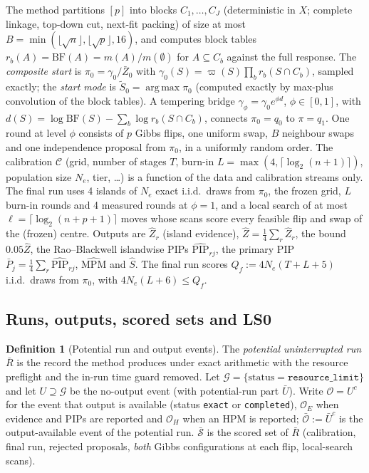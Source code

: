 \documentclass[11pt]{article}
\theoremstyle{definition}
\newtheorem{definition}{Definition}
\theoremstyle{remark}
\newcommand{\Sh}{\widehat S}
\newcommand{\Zh}{\widehat Z}
\newcommand{\PIPh}{\widehat{\mathrm{PIP}}}
\newcommand{\MPM}{\mathrm{MPM}}
\newcommand{\cC}{\mathcal C}
\newcommand{\cS}{\mathcal S}
\newcommand{\cO}{\mathcal O}
\newcommand{\cG}{\mathcal G}
\DeclareMathOperator*{\argmax}{arg\,max}
\begin{document}
The method partitions $[p]$ into blocks $C_1,\dots,C_J$ (deterministic in $X$; complete linkage, top-down cut,
next-fit packing) of size at most $B=\min(\lfloor\sqrt n\rfloor,\lfloor\sqrt p\rfloor,16)$, and computes block tables
$r_b(A)=\mathrm{BF}(A)=m(A)/m(\emptyset)$ for $A\subseteq C_b$ against the full response. The \emph{composite start}
is $\pi_0=\gamma_0/\bar Z_0$ with $\gamma_0(S)=\varpi(S)\prod_br_b(S\cap C_b)$, sampled exactly; the \emph{start
mode} is $\tilde S_0=\argmax\pi_0$ (computed exactly by max-plus convolution of the block tables). A
tempering bridge $\gamma_\phi=\gamma_0e^{\phi d}$, $\phi\in[0,1]$, with $d(S)=\log\mathrm{BF}(S)-\sum_b\log r_b(S\cap C_b)$,
connects $\pi_0=q_0$ to $\pi=q_1$. One round at level $\phi$ consists of $p$ Gibbs flips, one uniform swap, $B$
neighbour swaps and one independence proposal from $\pi_0$, in a uniformly random order. The calibration
$\cC$ (grid, number of stages $T$, burn-in $L=\max(4,\lceil\log_2(n+1)\rceil)$, population size $N_e$, tier, \dots)
is a function of the data and calibration streams only. The final run uses 4 islands of $N_e$ exact i.i.d.\ draws
from $\pi_0$, the frozen grid, $L$ burn-in rounds and 4 measured rounds at $\phi=1$, and a local search of at most
$\ell=\lceil\log_2(n+p+1)\rceil$ moves whose scans score every feasible flip and swap of the (frozen) centre. Outputs
are $\Zh_r$ (island evidence), $\Zh=\tfrac14\sum_r\Zh_r$, the bound $0.05\Zh$, the Rao--Blackwell islandwise PIPs
$\PIPh_{rj}$, the primary PIP $\bar P_j=\tfrac14\sum_r\PIPh_{rj}$, $\widehat{\MPM}$ and $\Sh$. The final run scores
$Q_f:=4N_e(T+L+5)$ i.i.d.\ draws from $\pi_0$, with $4N_e(L+6)\le Q_f$.

\subsection{Runs, outputs, scored sets and LS0}

\begin{definition}[Potential run and output events]\label{def:run}
The \emph{potential uninterrupted run} $\bar R$ is the record the method produces under exact arithmetic with the
resource preflight and the in-run time guard removed. Let $\cG=\{\text{status}=\texttt{resource\_limit}\}$ and let
$U\supseteq\cG$ be the no-output event (with potential-run part $\bar U$). Write $\cO=U^c$ for the event that output
is available (status \texttt{exact} or \texttt{completed}), $\cO_E$ when evidence and PIPs are reported and
$\cO_H$ when an HPM is reported; $\bar{\cO}:=\bar U^c$ is the output-available event of the potential run. $\bar{\cS}$ is the scored set of $\bar R$ (calibration, final run, rejected
proposals, \emph{both} Gibbs configurations at each flip, local-search scans).
\end{definition}
\end{document}
